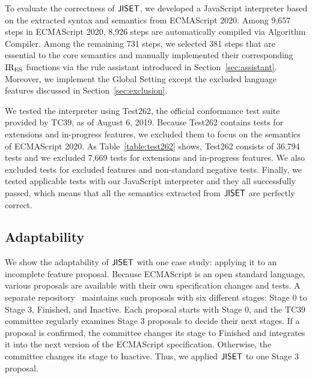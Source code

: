 To evaluate the correctness of \( \text{\sf JISET} \), we developed a JavaScript
interpreter based on the extracted syntax and semantics from
ECMAScript 2020.  Among 9,657 steps in ECMAScript 2020,
8,926 steps are automatically compiled via \textsf{Algorithm Compiler}.
Among the remaining 731 steps, we selected 381 steps
that are essential to the core semantics and manually
implemented their corresponding \( \text{IR}_\text{ES} \) functions
via the rule assistant introduced in Section~\ref{sec:assistant}.
Moreover, we implement the \textsf{Global Setting} except
the excluded language features discussed in Section~\ref{sec:exclusion}.

We tested the interpreter using Test262, the official conformance test
suite provided by TC39, as of August 6, 2019.  Because Test262
contains tests for extensions and in-progress features, we excluded
them to focus on the semantics of ECMAScript 2020.  As Table~\ref{table:test262} shows,
Test262 consists of 36,794 tests and we excluded 7,669 tests for
extensions and in-progress features.  We also excluded 
tests for excluded features and non-standard negative tests.
Finally, we tested  applicable tests with our JavaScript
interpreter and they all successfully passed, which means that all the
semantics extracted from \( \text{\sf JISET} \) are perfectly correct.


\subsection{Adaptability}
We show the adaptability of \( \text{\sf JISET} \) with one case study: applying
it to an incomplete feature proposal.  Because ECMAScript is an open
standard language, various proposals are available with their own
specification changes and tests.  A
separate repository~\cite{proposals} maintains such proposals with six
different stages: Stage 0 to Stage 3, Finished, and Inactive.  Each
proposal starts with Stage 0, and the TC39 committee regularly
examines Stage 3 proposals to decide their next stages.  If a proposal
is confirmed, the committee changes its stage to Finished and
integrates it into the next version of the ECMAScript specification.
Otherwise, the committee changes its stage to Inactive.  Thus, we
applied \( \text{\sf JISET} \) to one Stage 3 proposal.

